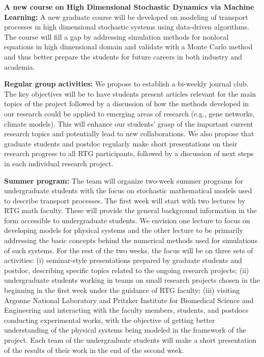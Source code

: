 \documentclass[11pt]{article}
\begin{document}
\textbf{A new course on High Dimensional Stochastic Dynamics via Machine Learning:}
A new graduate course will be developed on modeling of transport processes
in high dimensional stochastic systems using data-driven algorithms.  The course will fill a gap by addressing simulation methods for nonlocal equations in high dimensional domain and validate with a Monte Carlo  method and thus better prepare the students for future careers in both industry and academia.
 
 
 \textbf{Regular group activities:} We propose to establish a bi-weekly  
journal club. The key objectives will be to have students present articles relevant for the main topics of the
project followed by a discussion of how the methods developed in our research could be applied to emerging
areas of   research (e.g., gene networks, climate models). This will enhance our students’ grasp of the important current research topics
and potentially lead to new collaborations. We also propose that graduate students and postdoc regularly
make short presentations on their research progress to all RTG participants, followed by a discussion of next steps in each individual research project.


 \textbf{Summer program:} The team will organize two-week summer programs for undergraduate students with
the focus on stochastic mathematical models used to describe transport processes.
The first week will start with two lectures by RTG math faculty. These will provide the general background
information in the form accessible to undergraduate students. We envision one lecture to focus on developing
models for physical systems and the other lecture to be primarily addressing the basic concepts behind the
numerical methods used for simulations of such systems. For the rest of the two weeks, the focus will be on
three sets of activities: (i) seminar-style presentations prepared by graduate students and postdoc, describing
specific topics related to the ongoing research projects; (ii) undergraduate students working in teams on small
research projects chosen in the beginning in the first week under the guidance of RTG faculty; (iii) visiting
  Argonne National Laboratory and Pritzker Institute for Biomedical Science and Engineering and interacting with the faculty members, students, and
postdocs conducting experimental works, with the objective of getting better understanding of the physical
systems being modeled in the framework of the project. Each team of the undergraduate students will make
a short presentation of the results of their work in the end of the second week.
\end{document}
